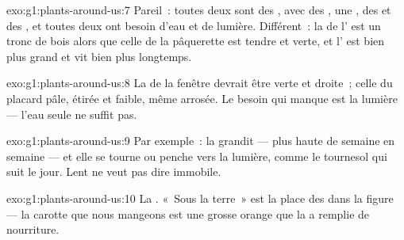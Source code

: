 \begin{solution}{exo:g1:plants-around-us:7}
Pareil~: toutes deux sont des , avec des , une ,
des  et des , et toutes deux ont besoin d'eau et de
lumière. Différent~: la  de l' est un tronc de bois alors
que celle de la pâquerette est tendre et verte, et l' est bien
plus grand et vit bien plus longtemps.
\end{solution}

\begin{solution}{exo:g1:plants-around-us:8}
La  de la fenêtre devrait être verte et droite~; celle du
placard pâle, étirée et faible, même arrosée. Le besoin qui manque
est la lumière --- l'eau seule ne suffit pas.
\end{solution}

\begin{solution}{exo:g1:plants-around-us:9}
Par exemple~: la  grandit --- plus haute de semaine en
semaine --- et elle se tourne ou penche vers la lumière, comme le
tournesol qui suit le jour. Lent ne veut pas dire immobile.
\end{solution}

\begin{solution}{exo:g1:plants-around-us:10}
La . «~Sous la terre~» est la place des  dans la figure
--- la carotte que nous mangeons est une grosse  orange que la
 a remplie de nourriture.
\end{solution}
